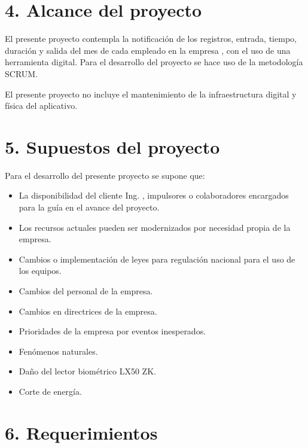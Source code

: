 \documentclass[
11pt, %
]{charter}
\begin{document}
\section{4. Alcance del proyecto}
\label{sec:alcance}




El presente proyecto contempla la notificación de los registros, entrada,
tiempo, duración y salida del mes de cada empleado en la empresa \empclientename, con el uso de una herramienta digital. Para el desarrollo del proyecto se hace uso de la metodología SCRUM.

El presente proyecto no incluye el mantenimiento de la infraestructura digital y física del
aplicativo.




\section{5. Supuestos del proyecto}
\label{sec:supuestos}



Para el desarrollo del presente proyecto se supone que: 

\begin{itemize}
	\item La disponibilidad del cliente Ing. \clientename, impulsores o colaboradores encargados para la guía en el avance del proyecto. 
	\item Los recursos actuales pueden ser modernizados por necesidad propia de la empresa.
	\item Cambios o implementación de leyes para regulación nacional para el uso de los equipos.
	\item Cambios del personal de la empresa.
	\item Cambios en directrices de la empresa.
	\item Prioridades de la empresa por eventos inesperados.
	\item Fenómenos naturales.
	\item Daño del lector biométrico LX50 ZK.
	\item Corte de energía.
\end{itemize}



\section{6. Requerimientos}
\label{sec:requerimientos}
\end{document}
